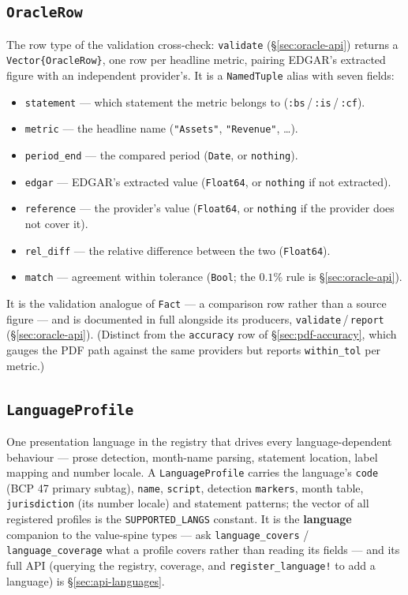 \documentclass[11pt,a4paper]{report}
\begin{document}
\subsection{\texttt{OracleRow}}
\label{sec:api-oraclerow}

\noindent The row type of the validation cross-check: \texttt{validate} (\S\ref{sec:oracle-api}) returns a
\texttt{Vector\{OracleRow\}}, one row per headline metric, pairing EDGAR's extracted figure with an independent
provider's. It is a \texttt{NamedTuple} alias with seven fields:
\begin{itemize}[nosep]
  \item \texttt{statement} --- which statement the metric belongs to (\texttt{:bs}\,/\,\texttt{:is}\,/\,\texttt{:cf}).
  \item \texttt{metric} --- the headline name (\texttt{"Assets"}, \texttt{"Revenue"}, \ldots).
  \item \texttt{period\_end} --- the compared period (\texttt{Date}, or \texttt{nothing}).
  \item \texttt{edgar} --- EDGAR's extracted value (\texttt{Float64}, or \texttt{nothing} if not extracted).
  \item \texttt{reference} --- the provider's value (\texttt{Float64}, or \texttt{nothing} if the provider
    does not cover it).
  \item \texttt{rel\_diff} --- the relative difference between the two (\texttt{Float64}).
  \item \texttt{match} --- agreement within tolerance (\texttt{Bool}; the \(0.1\%\) rule is
    \S\ref{sec:oracle-api}).
\end{itemize}

\noindent It is the validation analogue of \texttt{Fact} --- a comparison row rather than a source figure ---
and is documented in full alongside its producers, \texttt{validate}\,/\,\texttt{report}
(\S\ref{sec:oracle-api}). (Distinct from the \texttt{accuracy} row of \S\ref{sec:pdf-accuracy}, which gauges
the PDF path against the same providers but reports \texttt{within\_tol} per metric.)

\subsection{\texttt{LanguageProfile}}
\label{sec:api-languageprofile}

\noindent One presentation language in the registry that drives every language-dependent behaviour --- prose
detection, month-name parsing, statement location, label mapping and number locale. A \texttt{LanguageProfile}
carries the language's \texttt{code} (BCP 47 primary subtag), \texttt{name}, \texttt{script}, detection
\texttt{markers}, month table, \texttt{jurisdiction} (its number locale) and statement patterns; the vector of
all registered profiles is the \texttt{SUPPORTED\_LANGS} constant. It is the \textbf{language} companion to the
value-spine types --- ask \texttt{language\_covers} / \texttt{language\_coverage} what a profile covers rather
than reading its fields --- and its full API (querying the registry, coverage, and \texttt{register\_language!}
to add a language) is \S\ref{sec:api-languages}.
\end{document}
